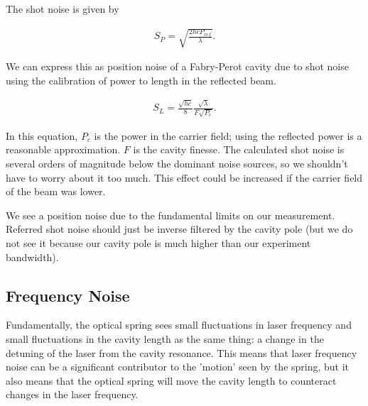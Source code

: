 The shot noise is given by \cite{black} 

\begin{eqnarray}
S_P = \sqrt{\frac{2 h c P_{ref}}{\lambda}}.
\label{eq:Rsn}
\end{eqnarray}

We can express this as position noise of a Fabry-Perot cavity due to shot noise using the calibration of power to length in the reflected beam.

\begin{eqnarray}
S_L = \frac{\sqrt{h c}}{8} \frac{\sqrt{\lambda}}{F\sqrt{P_c}}.
\label{eq:SL}
\end{eqnarray}

In this equation, $P_c$ is the power in the carrier field; using the reflected power is a reasonable approximation.  $F$ is the cavity finesse. The calculated shot noise is several orders of magnitude below the dominant noise sources, so we shouldn't have to worry about it too much.  This effect could be increased if the carrier field of the beam was lower.

 
%
%

We see a position noise due to the fundamental limits on our measurement.
Referred shot noise should just be inverse filtered by the cavity pole (but we do not see it because our cavity pole is much higher than our experiment bandwidth).

\subsection{Frequency Noise}

Fundamentally, the optical spring sees small fluctuations in laser frequency and small fluctuations in the cavity length as the same thing: a change in the detuning of the laser from the cavity resonance.  This means that laser frequency noise can be a significant contributor to the 'motion' seen by the spring, but it also means that the optical spring will move the cavity length to counteract changes in the laser frequency.

